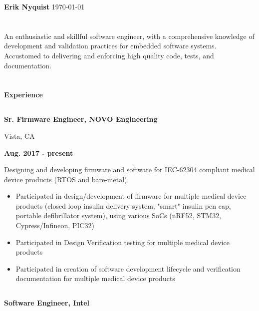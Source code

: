 \documentclass[a4paper,6pt]{article}
\begin{document}
\begin{minipage}{35em}
%
%
{\Huge \bfseries Erik Nyquist}
{\hfill \today}
\section*{}
An enthusiastic and skillful software engineer, with a comprehensive knowledge of
development and validation practices for embedded software systems. Accustomed to
delivering and enforcing high quality code, tests, and documentation.
\hfill \break
\section*{}
{\Large \bfseries Experience}

\dotfill
%
%
\subsection*{}
\begin{minipage}{22em}
{\bfseries Sr. Firmware Engineer, NOVO Engineering

Vista, CA}
\end{minipage}
\hfill
\begin{minipage}{10em}
{\bfseries Aug. 2017 - present}
\end{minipage}
\break

Designing and developing firmware and software for IEC-62304 compliant medical
device products (RTOS and bare-metal)
\begin{itemize}
    \item Participated in design/development of firmware for multiple medical
          device products (closed loop insulin delivery system, "smart" insulin pen
          cap, portable defibrillator system), using various SoCs (nRF52, STM32,
          Cypress/Infineon, PIC32)
    \item Participated in Design Verification testing for multiple medical device products
    \item Participated in creation of software development lifecycle and
          verification documentation for multiple medical device products
\end{itemize}
\dotfill

%
%
\subsection*{}
\begin{minipage}{20em}
{\bfseries Software Engineer, Intel

}
\end{minipage}
\end{minipage}
\end{document}
